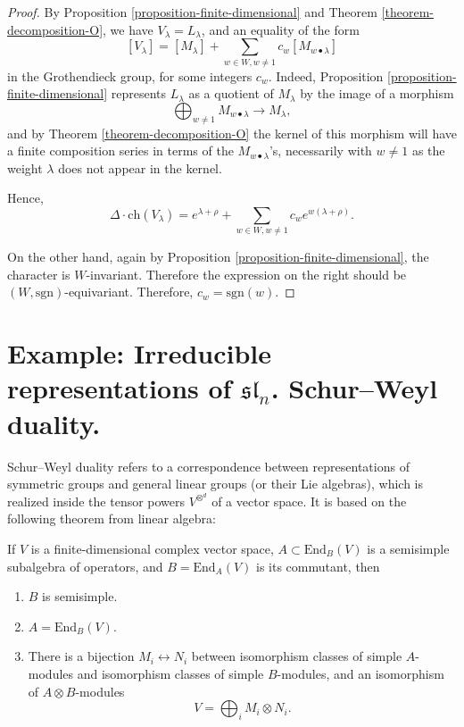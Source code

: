 \begin{proof}
By Proposition \ref{proposition-finite-dimensional} and Theorem \ref{theorem-decomposition-O}, we have $V_\lambda=L_\lambda$, and an equality of the form  
$$[V_\lambda]= [M_{\lambda}] + \sum_{w\in W, w\ne 1} c_w [M_{w\bullet \lambda}]$$
in the Grothendieck group, for some integers $c_w$. Indeed, Proposition \ref{proposition-finite-dimensional} represents $L_\lambda$ as a quotient of $M_\lambda$ by the image of a morphism 
$$\bigoplus_{w\ne 1} M_{w\bullet \lambda} \to M_\lambda,$$
and by Theorem \ref{theorem-decomposition-O} the kernel of this morphism will have a finite composition series in terms of the $M_{w\bullet \lambda}$'s, necessarily with $w\ne 1$ as the weight $\lambda$ does not appear in the kernel.

Hence,
$$ \Delta \cdot \text{ch}(V_\lambda) = e^{\lambda+\rho} + \sum_{w\in W,w\ne 1} c_w e^{w(\lambda+\rho)}.$$

On the other hand, again by Proposition \ref{proposition-finite-dimensional}, the character is $W$-invariant. Therefore the expression on the right should be $(W,\text{sgn})$-equivariant. Therefore, $c_w = \text{sgn}(w)$.
\end{proof}



\section{Example: Irreducible representations of $\mathfrak{sl}_n$. Schur--Weyl duality.}
\label{section-Schur-Weyl}

Schur--Weyl duality refers to a correspondence between representations of symmetric groups and general linear groups (or their Lie algebras), which is realized inside the tensor powers $V^{\otimes^d}$ of a vector space. It is based on the following theorem from linear algebra:

\begin{theorem}
\label{theorem-double-centralizer}
If $V$ is a finite-dimensional complex vector space, $A\subset \text{End}_B(V)$ is a semisimple subalgebra of operators, and $B = \text{End}_A(V)$ is its commutant, then 
\begin{enumerate}
 \item $B$ is semisimple.
 \item $A=\text{End}_B(V)$.
 \item There is a bijection $M_i\leftrightarrow N_i$ between isomorphism classes of simple $A$-modules and isomorphism classes of simple $B$-modules, and an isomorphism of $A\otimes B$-modules 
 $$V = \bigoplus_i M_i\otimes N_i.$$
\end{enumerate}
\end{theorem}

